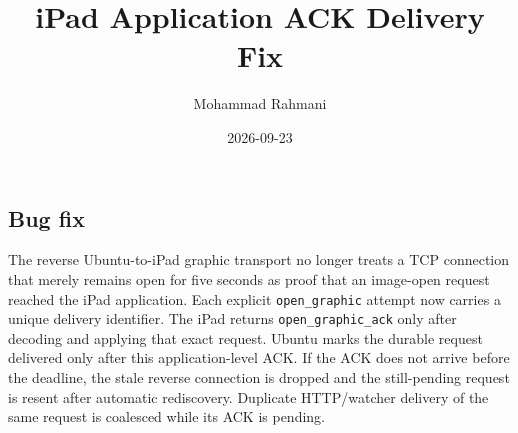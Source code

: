 \documentclass[a4paper]{article}
\title{iPad Application ACK Delivery Fix}
\date{2026-09-23}
\author{Mohammad Rahmani}
\begin{document}
\maketitle
\begin{preview}
\section{Bug fix}
The reverse Ubuntu-to-iPad graphic transport no longer treats a TCP connection that merely remains open for five seconds as proof that an image-open request reached the iPad application. Each explicit \texttt{open\_graphic} attempt now carries a unique delivery identifier. The iPad returns \texttt{open\_graphic\_ack} only after decoding and applying that exact request. Ubuntu marks the durable request delivered only after this application-level ACK. If the ACK does not arrive before the deadline, the stale reverse connection is dropped and the still-pending request is resent after automatic rediscovery. Duplicate HTTP/watcher delivery of the same request is coalesced while its ACK is pending.
\end{preview}
\end{document}
